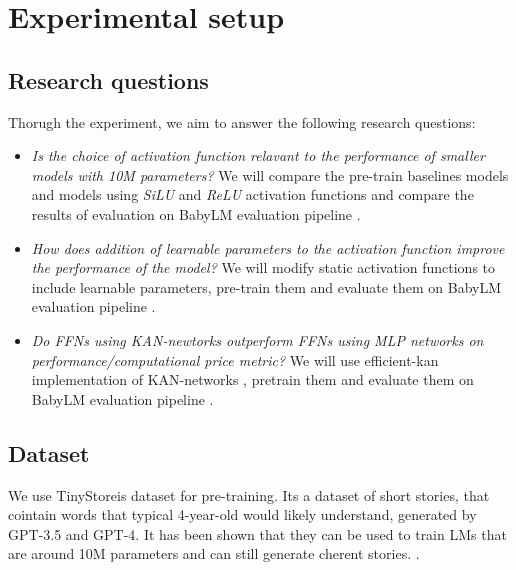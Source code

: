 
\section{Experimental setup}

\subsection{Research questions}
Thorugh the experiment, we aim to answer the following research questions:
\begin{itemize}
    \item \textit{Is the choice of activation function relavant to the performance of smaller models with 10M parameters?}  We will compare the pre-train baselines models and models using \textit{SiLU} and \textit{ReLU} activation functions and compare the results of evaluation on BabyLM evaluation pipeline \cite{Warstadt2023}.
    \item \textit{How does addition of learnable parameters to the activation function improve the performance of the model?} We will modify static activation functions to include learnable parameters, pre-train them and evaluate them on BabyLM evaluation pipeline \cite{Warstadt2023}.
    \item \textit{Do FFNs using KAN-newtorks outperform FFNs using MLP networks on performance/computational price metric?} We will use efficient-kan implementation of KAN-networks \cite{efficient-kan}, pretrain them and evaluate them on BabyLM evaluation pipeline \cite{Warstadt2023}.
\end{itemize}

\subsection{Dataset}
We use TinyStoreis dataset for pre-training. Its a dataset of short stories, that cointain words that typical 4-year-old would likely understand, generated by GPT-3.5 and GPT-4. It has been shown that they can be used to train LMs that are around 10M parameters and can still generate cherent stories. \cite{Eldan2023}.

